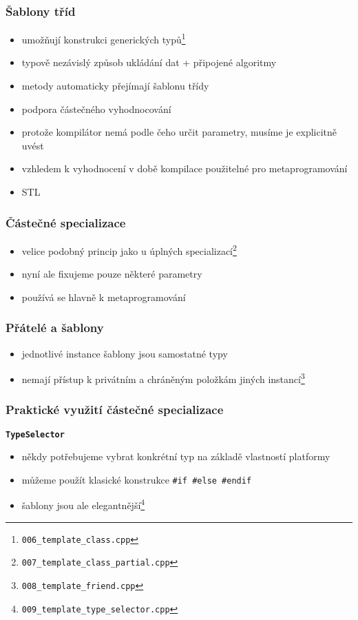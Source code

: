 	\begin{frame}
		\frametitle{Šablony tříd}
		\begin{itemize}
			\item{umožňují konstrukci generických typů\footnote{\texttt{006\_template\_class.cpp}}}
			\item{typově nezávislý způsob ukládání dat + připojené algoritmy}
			\item{metody automaticky přejímají šablonu třídy}
			\item{podpora částečného vyhodnocování}
			\item{protože kompilátor nemá podle čeho určit parametry, musíme je explicitně uvést}
			\item{vzhledem k vyhodnocení v době kompilace použitelné pro metaprogramování}
			\item{STL}
		\end{itemize}
	\end{frame}

	\begin{frame}
		\frametitle{Částečné specializace}
		\begin{itemize}
			\item{velice podobný princip jako u úplných specializací\footnote{\texttt{007\_template\_class\_partial.cpp}}}
			\item{nyní ale fixujeme pouze některé parametry}
			\item{používá se hlavně k metaprogramování}
		\end{itemize}
	\end{frame}

	\begin{frame}
		\frametitle{Přátelé a šablony}
		\begin{itemize}
			\item{jednotlivé instance šablony jsou samostatné typy}
			\item{nemají přístup k privátním a chráněným položkám jiných instancí\footnote{\texttt{008\_template\_friend.cpp}}}
		\end{itemize}
	\end{frame}


	\begin{frame}
		\frametitle{Praktické využití částečné specializace}
		\textbf{\texttt{TypeSelector}}\\
		\begin{itemize}
			\item{někdy potřebujeme vybrat konkrétní typ na základě vlastností platformy}
			\item{můžeme použít klasické konstrukce \texttt{\#if \#else \#endif}}
			\item{šablony jsou ale elegantnější\footnote{\texttt{009\_template\_type\_selector.cpp}}}
		\end{itemize}
	\end{frame}

